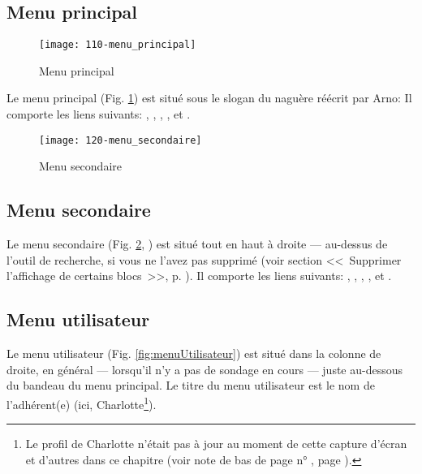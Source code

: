 \subsection{Menu principal}

\begin{figure}
    \texttt{[image: 110-menu\_principal]}
    \caption{Menu principal}
    \label{fig:menuPrincipal}
\end{figure}
Le menu principal (Fig. \ref{fig:menuPrincipal}) est situé sous le slogan du \sel{} naguère réécrit par Arno:  Il comporte les liens suivants: , , , , et .
\begin{figure}
    \texttt{[image: 120-menu\_secondaire]}
    \caption{Menu secondaire}
    \label{fig:menuSecondaire}
\end{figure}

\subsection{Menu secondaire\label{sec:menuSecondaire}}

Le menu secondaire (Fig. \ref{fig:menuSecondaire}, ) est situé tout en haut à droite --- au-dessus de l’outil de recherche, si vous ne l’avez pas supprimé (voir section <<~Supprimer l’affichage de certains blocs~>>, p. \pageref{sec:supprimerBlocs}). Il comporte les liens suivants: , , , , et .

\subsection{Menu utilisateur}\label{sec:menuUtilisateur}

Le menu utilisateur (Fig. \ref{fig:menuUtilisateur}) 
est situé dans la colonne de droite, en général --- \cad{} lorsqu'il n'y a pas de sondage en cours --- juste au-dessous du bandeau du menu principal. Le titre du menu utilisateur est le nom de l’adhérent(e) (ici, Charlotte\footnote{Le profil de Charlotte n'était pas à jour au moment de cette capture d'écran et d'autres dans ce chapitre (voir note de bas de page n° \thenoteProfilPasAJour, page \pageref{page:profilPasAJour}).}).

